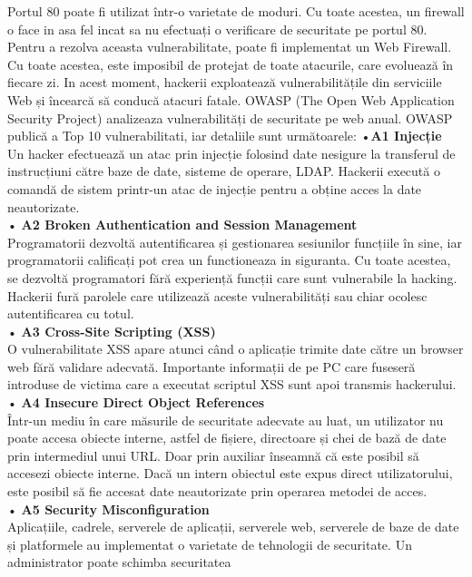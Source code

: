 \documentclass[oneside,20pt]{article}          %
\begin{document}
Portul 80 poate fi utilizat într-o varietate de moduri. Cu toate acestea, un firewall o face
in asa fel incat sa nu efectuați o verificare de securitate pe portul 80. Pentru a rezolva aceasta 
vulnerabilitate, poate fi implementat un Web Firewall. Cu toate acestea, este
imposibil de protejat de toate atacurile, care evoluează în fiecare zi. In acest moment, hackerii exploatează vulnerabilitățile din serviciile Web
și încearcă să conducă atacuri fatale.
OWASP (The Open Web Application Security Project) analizeaza vulnerabilități de securitate pe web anual. OWASP publică a
Top 10 vulnerabilitati, iar detaliile sunt următoarele:
•\textbf{A1 Injecție}\\
Un hacker efectuează un atac prin injecție folosind date nesigure
la transferul de instrucțiuni către baze de date, sisteme de operare,
LDAP. Hackerii execută o comandă de sistem printr-un
atac de injecție pentru a obține acces la date neautorizate.\\
•\textbf{ A2 Broken Authentication and Session Management}\\
Programatorii dezvoltă autentificarea și gestionarea sesiunilor
funcțiile în sine, iar programatorii calificați pot crea un
functioneaza in siguranta. Cu toate acestea, se dezvoltă programatori fără experiență
funcții care sunt vulnerabile la hacking. Hackerii fură
parolele care utilizează aceste vulnerabilități sau chiar ocolesc
autentificarea cu totul.\\
• \textbf{A3 Cross-Site Scripting (XSS)}\\
O vulnerabilitate XSS apare atunci când o aplicație trimite date către
un browser web fără validare adecvată. Importante
informații de pe PC care fuseseră introduse de victima care a
executat scriptul XSS sunt apoi transmis hackerului.\\
• \textbf{A4 Insecure Direct Object References}\\
Într-un mediu în care măsurile de securitate adecvate au
luat, un utilizator nu poate accesa obiecte interne, astfel de fișiere,
directoare și chei de bază de date prin intermediul unui URL. Doar prin auxiliar
înseamnă că este posibil să accesezi obiecte interne. Dacă un intern
obiectul este expus direct utilizatorului, este posibil să fie accesat
date neautorizate prin operarea metodei de acces.\\
• \textbf{A5 Security Misconfiguration}\\
Aplicațiile, cadrele, serverele de aplicații, serverele web,
serverele de baze de date și platformele au implementat o varietate de
tehnologii de securitate. Un administrator poate schimba securitatea
\end{document}
